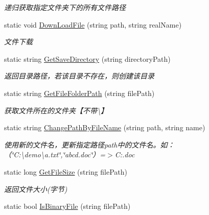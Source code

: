 \begin{DoxyCompactItemize}
\begin{DoxyCompactList}\small\item\em 递归获取指定文件夹下的所有文件路径 \end{DoxyCompactList}\item 
static void \hyperlink{class_x_c_l_net_tools_1_1_file_handler_1_1_com_file_a88a411e0efbbb5117f62ae15734b5a4b}{Down\+Load\+File} (string path, string real\+Name)
\begin{DoxyCompactList}\small\item\em 文件下载 \end{DoxyCompactList}\item 
static string \hyperlink{class_x_c_l_net_tools_1_1_file_handler_1_1_com_file_a7fd47f5dd58f607c4fad3bb596f2d7b6}{Get\+Save\+Directory} (string directory\+Path)
\begin{DoxyCompactList}\small\item\em 返回目录路径，若该目录不存在，则创建该目录 \end{DoxyCompactList}\item 
static string \hyperlink{class_x_c_l_net_tools_1_1_file_handler_1_1_com_file_a54bcd222d9060ea6ee9d64264caf9939}{Get\+File\+Folder\+Path} (string file\+Path)
\begin{DoxyCompactList}\small\item\em 获取文件所在的文件夹【不带\textquotesingle{}\textbackslash{}\textquotesingle{}】 \end{DoxyCompactList}\item 
static string \hyperlink{class_x_c_l_net_tools_1_1_file_handler_1_1_com_file_a738457a4d0f779375830827f460da5ce}{Change\+Path\+By\+File\+Name} (string path, string name)
\begin{DoxyCompactList}\small\item\em 使用新的文件名，更新指定路径path中的文件名。如：（\char`\"{}\+C\+:\textbackslash{}demo\textbackslash{}a.\+txt\char`\"{},\char`\"{}abcd.\+doc\char`\"{}）=$>$C\+:.doc \end{DoxyCompactList}\item 
static long \hyperlink{class_x_c_l_net_tools_1_1_file_handler_1_1_com_file_a14816af3acf91a20ded5325a889f8341}{Get\+File\+Size} (string file\+Path)
\begin{DoxyCompactList}\small\item\em 返回文件大小(字节) \end{DoxyCompactList}\item 
static bool \hyperlink{class_x_c_l_net_tools_1_1_file_handler_1_1_com_file_a9e413978309f59720a38228ad9c1aaa2}{Is\+Binary\+File} (string file\+Path)

\end{DoxyCompactItemize}
